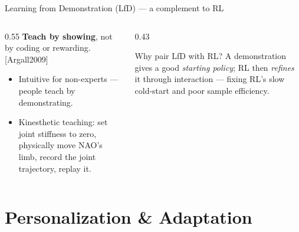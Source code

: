 \documentclass[aspectratio=169,10pt]{beamer}
\newcommand{\refnum}[1]{{\footnotesize\color{giuaccent}[#1]}}
\begin{document}
\begin{frame}{Learning from Demonstration (LfD) --- a complement to RL}
  \begin{columns}[T]
    \begin{column}{0.55\textwidth}
      \textbf{Teach by showing}, not by coding or rewarding. \refnum{Argall2009}
      \begin{itemize}
        \item Intuitive for non-experts --- people teach by demonstrating.
        \item \alert{Kinesthetic teaching}: set joint stiffness to zero, physically move NAO's limb, record the joint trajectory, replay it.
      \end{itemize}
    \end{column}
    \begin{column}{0.43\textwidth}
      \begin{block}{Why pair LfD with RL?}
        A demonstration gives a good \emph{starting policy}; RL then \emph{refines} it through interaction --- fixing RL's slow cold-start and poor sample efficiency.
      \end{block}
    \end{column}
  \end{columns}
\end{frame}

\section{Personalization \& Adaptation}
\end{document}
